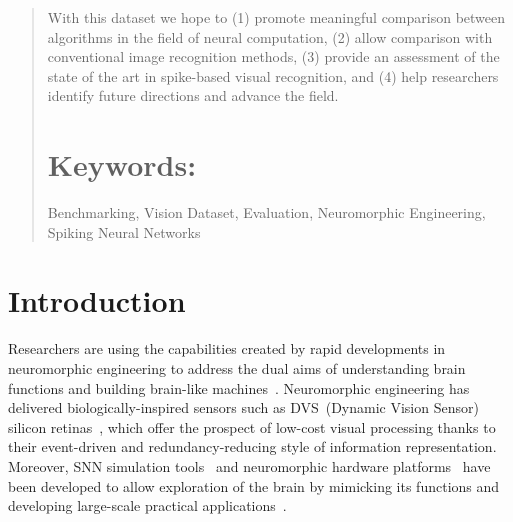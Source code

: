 \documentclass{frontiersENG} %
\begin{document}
\begin{abstract}
With this dataset we hope to (1) promote meaningful comparison between algorithms in the field of neural computation, (2) allow comparison with conventional image recognition methods, (3) provide an assessment of the state of the art in spike-based visual recognition, and (4) help researchers identify future directions and advance the field.

\tiny
\section{Keywords:} Benchmarking, Vision Dataset, Evaluation, Neuromorphic Engineering, Spiking Neural Networks
\end{abstract}

\section{Introduction}
\label{sec:intro}
Researchers are using the capabilities created by rapid developments in neuromorphic engineering to address the dual aims of understanding brain functions and building brain-like machines~\citep{furber2007neural}.
Neuromorphic engineering has delivered biologically-inspired sensors such as DVS~(Dynamic Vision Sensor) silicon retinas~\citep{serrano2013128, delbruck2008frame, yang2015dynamic, posch2014retinomorphic}, which offer the prospect of low-cost visual processing thanks to their event-driven and redundancy-reducing style of information representation.
Moreover, SNN simulation tools~\citep{davison2008pynn, gewaltig2007nest, goodman2008brian} and neuromorphic hardware platforms~\citep{furber2014spinnaker,  schemmel2010wafer,benjamin2014neurogrid,merolla2014million} have been developed to allow exploration of the brain by mimicking its functions and developing large-scale practical applications~\citep{eliasmith2012large}.
\end{document}
